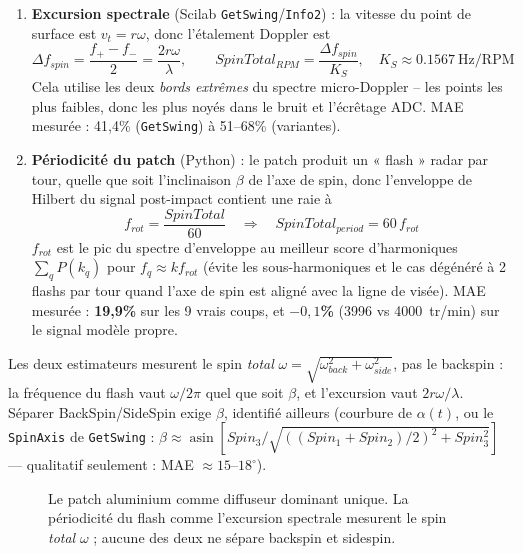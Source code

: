 \documentclass[10pt,a4paper]{report}
\begin{document}
\begin{enumerate}
  \item \textbf{Excursion spectrale} (Scilab \texttt{GetSwing}/\texttt{Info2}) : la vitesse du point de surface est $v_t = r\omega$, donc l'étalement Doppler est
  \begin{equation}
  \Delta f_{spin} = \frac{f_+ - f_-}{2} = \frac{2r\omega}{\lambda}, \qquad
  SpinTotal_{RPM} = \frac{\Delta f_{spin}}{K_S}, \quad K_S \approx 0.1567\ \text{Hz/RPM}
  \end{equation}
  Cela utilise les deux \emph{bords extrêmes} du spectre micro-Doppler -- les points les plus faibles, donc les plus noyés dans le bruit et l'écrêtage ADC. MAE mesurée : 41,4\% (\texttt{GetSwing}) à 51--68\% (variantes).

  \item \textbf{Périodicité du patch} (Python) : le patch produit un « flash » radar par tour, quelle que soit l'inclinaison $\beta$ de l'axe de spin, donc l'enveloppe de Hilbert du signal post-impact contient une raie à
  \begin{equation}
  f_{rot} = \frac{SpinTotal}{60} \quad\Longrightarrow\quad \boxed{SpinTotal_{period} = 60\,f_{rot}}
  \end{equation}
  $f_{rot}$ est le pic du spectre d'enveloppe au meilleur score d'harmoniques $\sum_q P(k_q)$ pour $f_q \approx k f_{rot}$ (évite les sous-harmoniques et le cas dégénéré à 2 flashs par tour quand l'axe de spin est aligné avec la ligne de visée). MAE mesurée : \textbf{19,9\%} sur les 9 vrais coups, et \textbf{$-0{,}1$\%} (3996 vs 4000~tr/min) sur le signal modèle propre.
\end{enumerate}

Les deux estimateurs mesurent le spin \emph{total} $\omega = \sqrt{\omega_{back}^2+\omega_{side}^2}$, pas le backspin : la fréquence du flash vaut $\omega/2\pi$ quel que soit $\beta$, et l'excursion vaut $2r\omega/\lambda$. Séparer BackSpin/SideSpin exige $\beta$, identifié ailleurs (courbure de $\alpha(t)$, ou le \texttt{SpinAxis} de \texttt{GetSwing} : $\beta \approx \operatorname{asin}[Spin_3/\sqrt{((Spin_1+Spin_2)/2)^2+Spin_3^2}]$ — qualitatif seulement : MAE $\approx 15$--$18^\circ$).

\begin{figure}[H]\centering
{}
\caption{Le patch aluminium comme diffuseur dominant unique. La périodicité du flash comme l'excursion spectrale mesurent le spin \emph{total} $\omega$ ; aucune des deux ne sépare backspin et sidespin.}
\label{fig:patch}
\end{figure}
\end{document}
